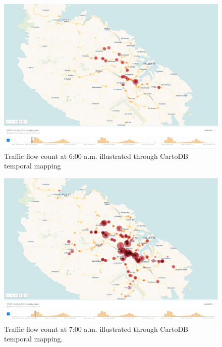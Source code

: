 \documentclass[12pt, a4paper]{report}
\theoremstyle{definition}
\theoremstyle{definition}%
\theoremstyle{definition}%
\theoremstyle{definition}%
\theoremstyle{definition}%
\theoremstyle{definition}%
\begin{document}
\begin{figure}[!]	
	\includegraphics[scale=0.4]{traffic_torque_600am.jpg}
	\centering
	\caption{Traffic flow count at 6:00 a.m. illustrated through CartoDB temporal mapping }
	\label{fig:traffic_torque_600am}
\end{figure}

\begin{figure}[!]	
	\includegraphics[scale=0.4]{traffic_torque_700am.jpg}
	\centering
	\caption{Traffic flow count at 7:00 a.m. illustrated through CartoDB temporal mapping. }
	\label{fig:traffic_torque_700am}
\end{figure}  
\end{document}

